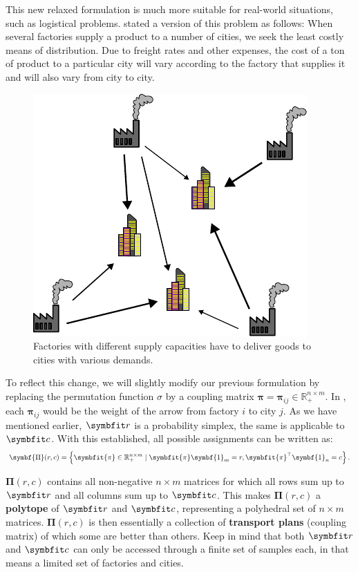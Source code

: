 This new relaxed formulation is much more suitable for real-world situations, such as logistical problems. \textcite{hitchcock1941distribution} stated a version of this problem as follows:
When several factories supply a product to a number of cities, we seek the least costly means of distribution. Due to freight rates and other expenses, the cost of a ton of product to a particular city will vary according to the factory that supplies it and will also vary from city to city.
\begin{figure}[ht]
    \centering
    \includegraphics{chapters/assets/ot/logistic.pdf}
    \caption{Factories with different supply capacities have to deliver goods to cities with various demands.}
    \label{fig:ot-factories}
\end{figure}

To reflect this change, we will slightly modify our previous formulation by replacing the permutation function $\sigma$ by a coupling matrix $\symbf{\pi} = \symbf{\pi}_{i j} \in \mathbb{R}_{+}^{n \times m}$. In , each $\symbf{\pi}_{i j}$ would be the weight of the arrow from factory $i$ to city $j$.
As we have mentioned earlier, $\bfitr$ is a probability simplex, the same is applicable to $\bfitc$. With this established, all possible assignments can be written as:
\begin{equation} 
\label{eqn:ot-def}
\symbf{\Pi}(r, c)=\left\{\symbfit{\pi} \in \mathbb{R}_{+}^{n \times m} \mid \symbfit{\pi} \symbf{1}_{m}=r, \symbfit{\pi}^{\top} \symbf{1}_{n}=c\right\}.
\end{equation}

$\symbf{\Pi}(r, c)$ contains all non-negative $n \times m$ matrices for which all rows sum up to $\bfitr$ and all columns sum up to $\bfitc$. 
This makes $\symbf{\Pi}(r, c)$ a \textbf{polytope} of $\bfitr$ and $\bfitc$, representing a polyhedral set of $n \times m$ matrices.
$\symbf{\Pi}(r, c)$ is then essentially a collection of \textbf{transport plans} (coupling matrix) of which some are better than others.
Keep in mind that both $\bfitr$ and $\bfitc$ can only be accessed through a finite set of samples each, in  that means a limited set of factories and cities.

